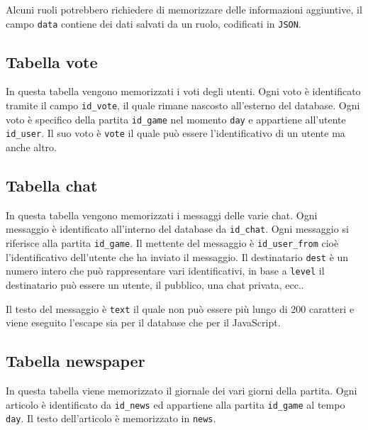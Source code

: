 \documentclass[10pt,a4paper]{article}
\begin{document}
Alcuni ruoli potrebbero richiedere di memorizzare delle informazioni aggiuntive, il campo \texttt{data} contiene dei dati salvati da un ruolo, codificati in \texttt{JSON}.

\subsection{Tabella vote}
In questa tabella vengono memorizzati i voti degli utenti. Ogni voto è identificato tramite il campo \texttt{id\_vote}, il quale rimane nascosto all'esterno del database. Ogni voto è specifico della partita \texttt{id\_game} nel momento \texttt{day} e appartiene all'utente \texttt{id\_user}. Il suo voto è \texttt{vote} il quale può essere l'identificativo di un utente ma anche altro. 

\subsection{Tabella chat}
In questa tabella vengono memorizzati i messaggi delle varie chat. Ogni messaggio è identificato all'interno del database da \texttt{id\_chat}. Ogni messaggio si riferisce alla partita \texttt{id\_game}. Il mettente del messaggio è \texttt{id\_user\_from} cioè l'identificativo dell'utente che ha inviato il messaggio. Il destinatario \texttt{dest} è un numero intero che può rappresentare vari identificativi, in base a \texttt{level} il destinatario può essere un utente, il pubblico, una chat privata, ecc..

Il testo del messaggio è \texttt{text} il quale non può essere più lungo di 200 caratteri e viene eseguito l'escape sia per il database che per il JavaScript.

\subsection{Tabella newspaper}
In questa tabella viene memorizzato il giornale dei vari giorni della partita. Ogni articolo è identificato da \texttt{id\_news} ed appartiene alla partita \texttt{id\_game} al tempo \texttt{day}. Il testo dell'articolo è memorizzato in \texttt{news}.

\newpage
\tableofcontents
\end{document}
